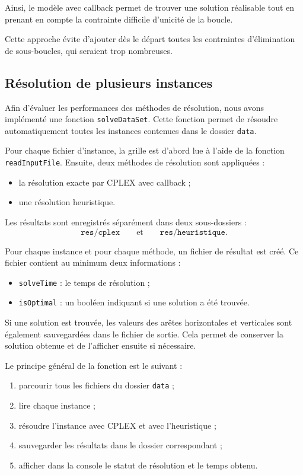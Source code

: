 Ainsi, le modèle avec callback permet de trouver une solution réalisable tout en prenant en compte la contrainte difficile d'unicité de la boucle.

Cette approche évite d'ajouter dès le départ toutes les contraintes d'élimination de sous-boucles, qui seraient trop nombreuses.

\subsection{Résolution de plusieurs instances}

Afin d'évaluer les performances des méthodes de résolution, nous avons implémenté une fonction \texttt{solveDataSet}. Cette fonction permet de résoudre automatiquement toutes les instances contenues dans le dossier \texttt{data}.

Pour chaque fichier d'instance, la grille est d'abord lue à l'aide de la fonction \texttt{readInputFile}. Ensuite, deux méthodes de résolution sont appliquées :
\begin{itemize}
    \item la résolution exacte par CPLEX avec callback ;
    \item une résolution heuristique.
\end{itemize}

Les résultats sont enregistrés séparément dans deux sous-dossiers :
\[
\texttt{res/cplex}
\qquad \text{et} \qquad
\texttt{res/heuristique}.
\]

Pour chaque instance et pour chaque méthode, un fichier de résultat est créé. Ce fichier contient au minimum deux informations :
\begin{itemize}
    \item \texttt{solveTime} : le temps de résolution ;
    \item \texttt{isOptimal} : un booléen indiquant si une solution a été trouvée.
\end{itemize}

Si une solution est trouvée, les valeurs des arêtes horizontales et verticales sont également sauvegardées dans le fichier de sortie. Cela permet de conserver la solution obtenue et de l'afficher ensuite si nécessaire.

Le principe général de la fonction est le suivant :
\begin{enumerate}
    \item parcourir tous les fichiers du dossier \texttt{data} ;
    \item lire chaque instance ;
    \item résoudre l'instance avec CPLEX et avec l'heuristique ;
    \item sauvegarder les résultats dans le dossier correspondant ;
    \item afficher dans la console le statut de résolution et le temps obtenu.
\end{enumerate}


